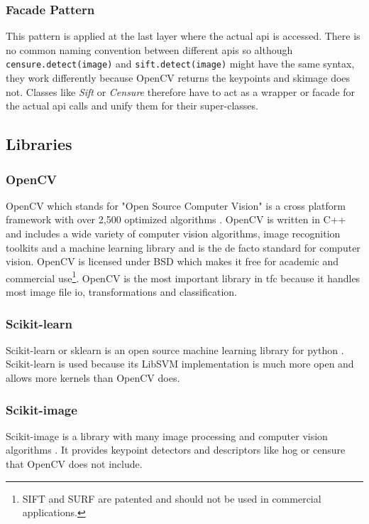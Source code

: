 		\subsubsection*{Facade Pattern}
		This pattern is applied at the last layer where the actual \gls{api} is accessed. There is no common naming convention between different \glspl{api} so although \verb|censure.detect(image)| and  \verb|sift.detect(image)| might have the same syntax, they work differently because OpenCV returns the keypoints and skimage does not. Classes like \textit{Sift} or \textit{Censure} therefore have to act as a wrapper or facade for the actual \gls{api} calls and unify them for their super-classes.
	
		
	
	
	
	\subsection{Libraries}
		
		\subsubsection*{OpenCV}
		\label{subsubsec:openCV}
		OpenCV which stands for "Open Source Computer Vision" is a cross platform framework with over 2,500 optimized algorithms \cite{bradski2000opencv, openCVWebsite}. OpenCV is written in C++ and includes a wide variety of computer vision algorithms, image recognition toolkits and a machine learning library and is the de facto standard for computer vision. OpenCV is licensed under BSD which makes it free for academic and commercial use\footnote{SIFT and SURF are patented \cite{Lowe2004a} \cite{Funayama2012} and should not be used in commercial applications.}. OpenCV is the most important library in \gls{tfc} because it handles most image file \gls{io}, transformations and classification.
		
		\subsubsection*{Scikit-learn}
		Scikit-learn or sklearn is an open source machine learning library for python \cite{Pedregosa2011}. Scikit-learn is used because its LibSVM implementation is much more open and allows more kernels than OpenCV does.
		
		\subsubsection*{Scikit-image}
		Scikit-image is a library with many image processing and computer vision algorithms \cite{scikit-image}. It provides keypoint detectors and descriptors like \gls{hog} or \gls{censure} that OpenCV does not include.
		
